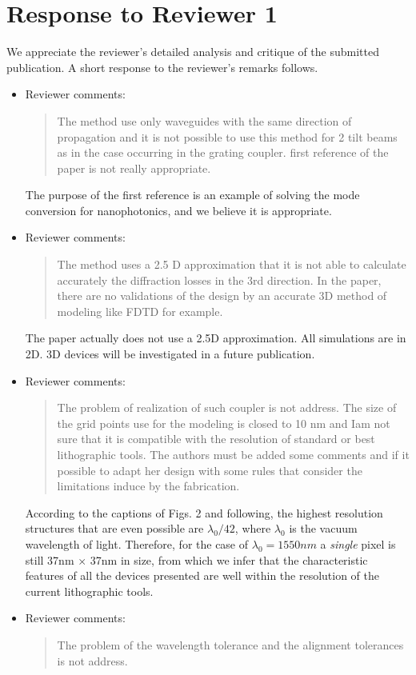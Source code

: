 \documentclass{article}
\newcommand{\Q}[1]{\begin{quote} #1 \end{quote}}
\begin{document}
\section*{Response to Reviewer 1}
We appreciate the reviewer's detailed analysis and critique of the submitted
    publication.
A short response to the reviewer's remarks follows.
\begin{itemize}
\item Reviewer comments: 
    \Q{The method use only waveguides with the same direction of propagation and it is not
    possible to use this method for 2 tilt beams as in the case occurring in the grating
    coupler. first reference of the paper is not really appropriate.}

    The purpose of the first reference is an example of
        solving the mode conversion for nanophotonics, 
        and we believe it is appropriate.

\item Reviewer comments: 
    \Q{The method uses a 2.5 D approximation that it is not able to calculate accurately the
diffraction losses in the 3rd direction. In the paper, there are no validations of the
design by an accurate 3D method of modeling like FDTD for example.}

    The paper actually does not use a 2.5D approximation. 
    All simulations are in 2D. 
    3D devices will be investigated in a future publication.

\item Reviewer comments:
    \Q{The problem of realization of such coupler is not address. The size of the grid points
use for the modeling is closed to 10 nm and Iam not sure that it is compatible with the
resolution of standard or best lithographic tools. The authors must be added some
comments and if it possible to adapt her design with some rules that consider the
limitations induce by the fabrication.}

    According to the captions of Figs. 2 and following, the highest resolution 
    structures that are even possible are $\lambda_0/42$, where $\lambda_0$
    is the vacuum wavelength of light. 
    Therefore, for the case of $\lambda_0 = 1550 nm$ a \emph{single} pixel is 
    still 37nm $\times$ 37nm in size, from which we infer that the
    characteristic features of all the devices presented are well within
    the resolution of the current lithographic tools.

\item Reviewer comments:
    \Q{The problem of the wavelength tolerance and the alignment tolerances is not address.}


\end{itemize}
\end{document}
